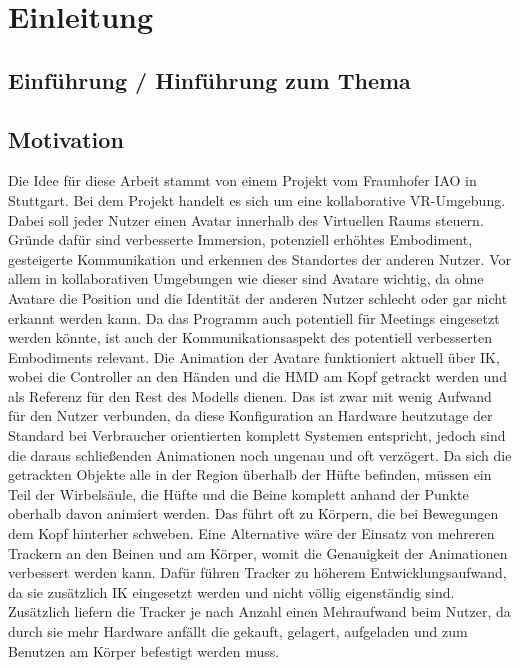 \chapter{Einleitung}

\section{Einführung / Hinführung zum Thema}


\section{Motivation}
Die Idee für diese Arbeit stammt von einem Projekt vom Fraunhofer IAO in Stuttgart. Bei dem Projekt handelt es sich um eine kollaborative VR-Umgebung. Dabei soll jeder Nutzer einen Avatar innerhalb des Virtuellen Raums steuern. 
Gründe dafür sind verbesserte Immersion, potenziell erhöhtes Embodiment, gesteigerte Kommunikation und erkennen des Standortes der anderen Nutzer. Vor allem in kollaborativen Umgebungen wie dieser sind Avatare wichtig, da ohne Avatare die Position und die Identität der anderen Nutzer schlecht oder gar nicht erkannt werden kann. Da das Programm auch potentiell für Meetings eingesetzt werden könnte, ist auch der Kommunikationsaspekt des potentiell verbesserten Embodiments relevant. Die Animation der Avatare funktioniert aktuell über IK, wobei die Controller an den Händen und die HMD am Kopf getrackt werden und als Referenz für den Rest des Modells dienen. Das ist zwar mit wenig Aufwand für den Nutzer verbunden, da diese Konfiguration an Hardware heutzutage der Standard bei Verbraucher orientierten komplett Systemen entspricht, jedoch sind die daraus schließenden Animationen noch ungenau und oft verzögert. Da sich die getrackten Objekte alle in der Region überhalb der Hüfte befinden, müssen ein Teil der Wirbelsäule, die Hüfte und die Beine komplett anhand der Punkte oberhalb davon animiert werden. Das führt oft zu Körpern, die bei Bewegungen dem Kopf hinterher schweben.
Eine Alternative wäre der Einsatz von mehreren Trackern an den Beinen und am Körper, womit die Genauigkeit der Animationen verbessert werden kann. Dafür führen Tracker zu höherem Entwicklungsaufwand, da sie zusätzlich IK eingesetzt werden und nicht völlig eigenständig sind. Zusätzlich liefern die Tracker je nach Anzahl einen Mehraufwand beim Nutzer, da durch sie mehr Hardware anfällt die gekauft, gelagert, aufgeladen und zum Benutzen am Körper befestigt werden muss.


